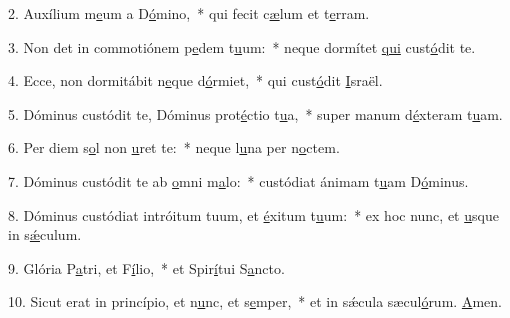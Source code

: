 2. Auxílium m\uline{e}um a D\uline{ó}mino,~* qui fecit c\uline{æ}lum et t\uline{e}rram.\par 
3. Non det in commotiónem p\uline{e}dem t\uline{u}um:~* neque dormítet \uline{qui} cust\uline{ó}dit te.\par 
4. Ecce, non dormitábit n\uline{e}que d\uline{ó}rmiet,~* qui cust\uline{ó}dit \uline{I}sraël.\par 
5. Dóminus custódit te, Dóminus prot\uline{é}ctio t\uline{u}a,~* super manum d\uline{é}xteram t\uline{u}am.\par 
6. Per diem s\uline{o}l non \uline{u}ret te:~* neque l\uline{u}na per n\uline{o}ctem.\par 
7. Dóminus custódit te ab \uline{o}mni m\uline{a}lo:~* custódiat ánimam t\uline{u}am D\uline{ó}minus.\par 
8. Dóminus custódiat intróitum tuum, et \uline{é}xitum t\uline{u}um:~* ex hoc nunc, et \uline{u}sque in s\uline{ǽ}culum.\par 
9. Glória P\uline{a}tri, et F\uline{í}lio,~* et Spir\uline{í}tui S\uline{a}ncto.\par 
10. Sicut erat in princípio, et n\uline{u}nc, et s\uline{e}mper,~* et in sǽcula sæcul\uline{ó}rum. \uline{A}men.\par 
